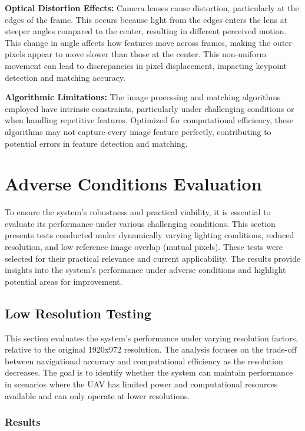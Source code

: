 \textbf{Optical Distortion Effects:}  
Camera lenses cause distortion, particularly at the edges of the frame. This occurs because light from the edges enters the lens at steeper angles compared to the center, resulting in different perceived motion. This change in angle affects how features move across frames, making the outer pixels appear to move slower than those at the center. This non-uniform movement can lead to discrepancies in pixel displacement, impacting keypoint detection and matching accuracy. 

\textbf{Algorithmic Limitations:}  
The image processing and matching algorithms employed have intrinsic constraints, particularly under challenging conditions or when handling repetitive features. Optimized for computational efficiency, these algorithms may not capture every image feature perfectly, contributing to potential errors in feature detection and matching.


\section{Adverse Conditions Evaluation}

To ensure the system's robustness and practical viability, it is essential to evaluate its performance under various challenging conditions. This section presents tests conducted under dynamically varying lighting conditions, reduced resolution, and low reference image overlap (mutual pixels). These tests were selected for their practical relevance and current applicability. The results provide insights into the system's performance under adverse conditions and highlight potential areas for improvement.

\subsection{Low Resolution Testing}

This section evaluates the system's performance under varying resolution factors, relative to the original 1920x972 resolution. The analysis focuses on the trade-off between navigational accuracy and computational efficiency as the resolution decreases. The goal is to identify whether the system can maintain performance in scenarios where the UAV has limited power and computational resources available and can only operate at lower resolutions.

\subsubsection{Results}

